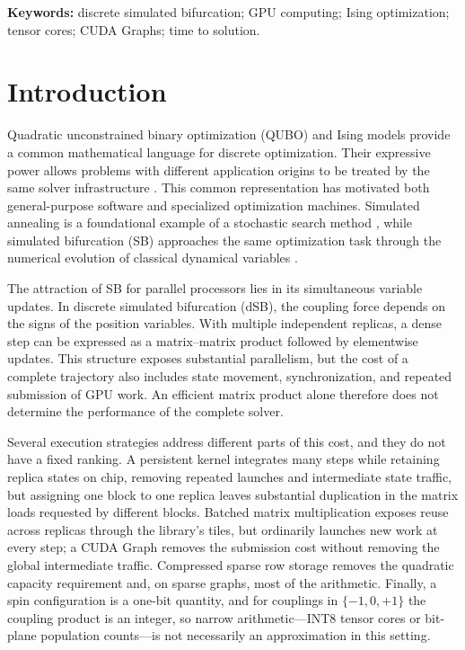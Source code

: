 \documentclass[11pt,a4paper]{article}
\begin{document}
\begin{abstract}
3,000,000 variables (1.1~TB of couplings, 254~GB in HBM and 871~GB streamed from Grace memory) at 1.40~s per step, the two-tier model holding to within 2\%, and recovers the planted ground state of Mattis instances exactly at every size from 500,000 to 3,000,000 variables.
\end{abstract}
\noindent\textbf{Keywords:} discrete simulated bifurcation; GPU computing; Ising optimization; tensor cores; CUDA Graphs; time to solution.

\section{Introduction}
Quadratic unconstrained binary optimization (QUBO) and Ising models provide a common mathematical language for discrete optimization. Their expressive power allows problems with different application origins to be treated by the same solver infrastructure \cite{lucas,glover,boros}. This common representation has motivated both general-purpose software and specialized optimization machines. Simulated annealing is a foundational example of a stochastic search method \cite{kirkpatrick}, while simulated bifurcation (SB) approaches the same optimization task through the numerical evolution of classical dynamical variables \cite{goto2019,goto2021}.

The attraction of SB for parallel processors lies in its simultaneous variable updates. In discrete simulated bifurcation (dSB), the coupling force depends on the signs of the position variables. With multiple independent replicas, a dense step can be expressed as a matrix--matrix product followed by elementwise updates. This structure exposes substantial parallelism, but the cost of a complete trajectory also includes state movement, synchronization, and repeated submission of GPU work. An efficient matrix product alone therefore does not determine the performance of the complete solver.

Several execution strategies address different parts of this cost, and they do not have a fixed ranking. A persistent kernel integrates many steps while retaining replica states on chip, removing repeated launches and intermediate state traffic, but assigning one block to one replica leaves substantial duplication in the matrix loads requested by different blocks. Batched matrix multiplication exposes reuse across replicas through the library's tiles, but ordinarily launches new work at every step; a CUDA Graph removes the submission cost without removing the global intermediate traffic. Compressed sparse row storage removes the quadratic capacity requirement and, on sparse graphs, most of the arithmetic. Finally, a spin configuration is a one-bit quantity, and for couplings in $\{-1,0,+1\}$ the coupling product is an integer, so narrow arithmetic---INT8 tensor cores or bit-plane population counts---is not necessarily an approximation in this setting.
\end{document}
